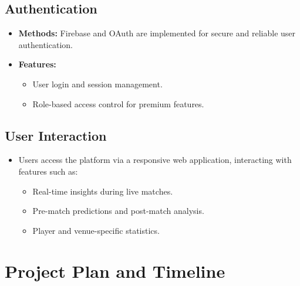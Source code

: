 \subsection{Authentication}
\begin{itemize}
    \item \textbf{Methods:} Firebase and OAuth are implemented for secure and reliable user authentication.
    \item \textbf{Features:}
    \begin{itemize}
        \item User login and session management.
        \item Role-based access control for premium features.
    \end{itemize}
\end{itemize}

\subsection{User Interaction}
\begin{itemize}
    \item Users access the platform via a responsive web application, interacting with features such as:
    \begin{itemize}
        \item Real-time insights during live matches.
        \item Pre-match predictions and post-match analysis.
        \item Player and venue-specific statistics.
    \end{itemize}
\end{itemize}



\section{Project Plan and Timeline}

